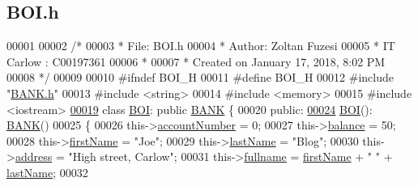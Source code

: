 \hypertarget{_b_o_i_8h_source}{}\subsection{B\+O\+I.\+h}

\begin{DoxyCode}
00001 
00002 \textcolor{comment}{/* }
00003 \textcolor{comment}{ * File:   BOI.h}
00004 \textcolor{comment}{ * Author: Zoltan Fuzesi}
00005 \textcolor{comment}{ * IT Carlow : C00197361}
00006 \textcolor{comment}{ *}
00007 \textcolor{comment}{ * Created on January 17, 2018, 8:02 PM}
00008 \textcolor{comment}{ */}
00009 
00010 \textcolor{preprocessor}{#ifndef BOI\_H}
00011 \textcolor{preprocessor}{#define BOI\_H}
00012 \textcolor{preprocessor}{#include "\hyperlink{_b_a_n_k_8h}{BANK.h}"}
00013 \textcolor{preprocessor}{#include <string>}
00014 \textcolor{preprocessor}{#include <memory>}
00015 \textcolor{preprocessor}{#include <iostream>}
\hypertarget{_b_o_i_8h_source.tex_l00019}{}\hyperlink{class_b_o_i}{00019} \textcolor{keyword}{class }\hyperlink{class_b_o_i}{BOI}: \textcolor{keyword}{public} \hyperlink{class_b_a_n_k}{BANK} \{
00020 \textcolor{keyword}{public}:
\hypertarget{_b_o_i_8h_source.tex_l00024}{}\hyperlink{class_b_o_i_a6af682a5f199a029681f0cb2b8658706_a6af682a5f199a029681f0cb2b8658706}{00024}     \hyperlink{class_b_o_i_a6af682a5f199a029681f0cb2b8658706_a6af682a5f199a029681f0cb2b8658706}{BOI}(): \hyperlink{class_b_a_n_k}{BANK}()
00025     \{
00026         this->\hyperlink{class_b_o_i_a35c9fd6e938eb44ad4e076bc6a736851_a35c9fd6e938eb44ad4e076bc6a736851}{accountNumber} = 0;
00027         this->\hyperlink{class_b_o_i_aa00a3d8baf3420647c40119b7fa4ed6f_aa00a3d8baf3420647c40119b7fa4ed6f}{balance} = 50;
00028         this->\hyperlink{class_b_o_i_a12872fd8c15dbf833f78862b00579ed1_a12872fd8c15dbf833f78862b00579ed1}{firstName} = \textcolor{stringliteral}{"Joe"};
00029         this->\hyperlink{class_b_o_i_ad51bfa6f28816c7f5036447ff809cecf_ad51bfa6f28816c7f5036447ff809cecf}{lastName} = \textcolor{stringliteral}{"Blog"};
00030         this->\hyperlink{class_b_o_i_ab9315fe76fd9f07551f5ae7899d33516_ab9315fe76fd9f07551f5ae7899d33516}{address} = \textcolor{stringliteral}{"High street, Carlow"};
00031         this->\hyperlink{class_b_o_i_a6d7c892a54bb6f7327cdc777081ab5f4_a6d7c892a54bb6f7327cdc777081ab5f4}{fullname} = \hyperlink{class_b_o_i_a12872fd8c15dbf833f78862b00579ed1_a12872fd8c15dbf833f78862b00579ed1}{firstName} + \textcolor{stringliteral}{" "} + \hyperlink{class_b_o_i_ad51bfa6f28816c7f5036447ff809cecf_ad51bfa6f28816c7f5036447ff809cecf}{lastName};
00032         

\end{DoxyCode}
